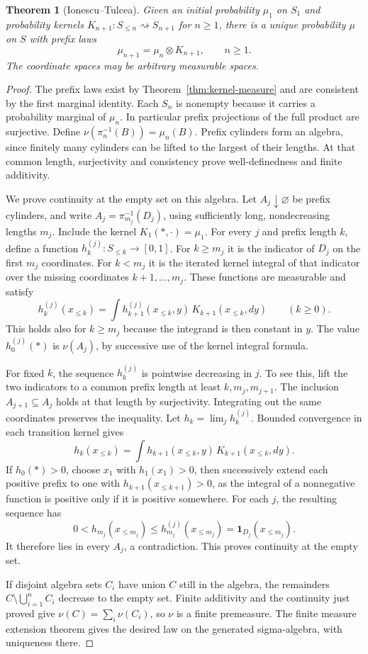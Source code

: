 \documentclass[11pt,oneside,openany]{book}
\newcommand{\ind}{\mathbf{1}}
\theoremstyle{plain}
\newtheorem{theorem}{Theorem}[chapter]
\theoremstyle{definition}
\theoremstyle{remark}
\begin{document}
\begin{theorem}[Ionescu--Tulcea]\label{thm:ionescu-tulcea}
Given an initial probability \(\mu_1\) on \(S_1\) and probability kernels \(K_{n+1}:S_{\le n}\rightsquigarrow S_{n+1}\) for \(n\ge1\), there is a unique probability \(\mu\) on \(S\) with prefix laws
\[
 \mu_{n+1}=\mu_n\otimes K_{n+1},\qquad n\ge1.
\]
The coordinate spaces may be arbitrary measurable spaces.
\end{theorem}
\begin{proof}
The prefix laws exist by Theorem~\ref{thm:kernel-measure} and are consistent by the first marginal identity. Each \(S_n\) is nonempty because it carries a probability marginal of \(\mu_n\). In particular prefix projections of the full product are surjective. Define \(\nu(\pi_n^{-1}(B))=\mu_n(B)\). Prefix cylinders form an algebra, since finitely many cylinders can be lifted to the largest of their lengths. At that common length, surjectivity and consistency prove well-definedness and finite additivity.

We prove continuity at the empty set on this algebra. Let \(A_j\downarrow\varnothing\) be prefix cylinders, and write \(A_j=\pi_{m_j}^{-1}(D_j)\), using sufficiently long, nondecreasing lengths \(m_j\). Include the kernel \(K_1(*,\cdot)=\mu_1\). For every \(j\) and prefix length \(k\), define a function \(h_k^{(j)}:S_{\le k}\to[0,1]\). For \(k\ge m_j\) it is the indicator of \(D_j\) on the first \(m_j\) coordinates. For \(k<m_j\) it is the iterated kernel integral of that indicator over the missing coordinates \(k+1,\ldots,m_j\). These functions are measurable and satisfy
\[
 h_k^{(j)}(x_{\le k})
   =\int h_{k+1}^{(j)}(x_{\le k},y)\,K_{k+1}(x_{\le k},dy)
 \qquad(k\ge0).
\]
This holds also for \(k\ge m_j\) because the integrand is then constant in \(y\). The value \(h_0^{(j)}(*)\) is \(\nu(A_j)\), by successive use of the kernel integral formula.

For fixed \(k\), the sequence \(h_k^{(j)}\) is pointwise decreasing in \(j\). To see this, lift the two indicators to a common prefix length at least \(k,m_j,m_{j+1}\). The inclusion \(A_{j+1}\subseteq A_j\) holds at that length by surjectivity. Integrating out the same coordinates preserves the inequality. Let \(h_k=\lim_j h_k^{(j)}\). Bounded convergence in each transition kernel gives
\[
 h_k(x_{\le k})
   =\int h_{k+1}(x_{\le k},y)\,K_{k+1}(x_{\le k},dy).
\]
If \(h_0(*)>0\), choose \(x_1\) with \(h_1(x_1)>0\), then successively extend each positive prefix to one with \(h_{k+1}(x_{\le k+1})>0\), as the integral of a nonnegative function is positive only if it is positive somewhere. For each \(j\), the resulting sequence has
\[
 0<h_{m_j}(x_{\le m_j})\le h_{m_j}^{(j)}(x_{\le m_j})
   =\ind_{D_j}(x_{\le m_j}).
\]
It therefore lies in every \(A_j\), a contradiction. This proves continuity at the empty set.

If disjoint algebra sets \(C_i\) have union \(C\) still in the algebra, the remainders \(C\setminus\bigcup_{i=1}^n C_i\) decrease to the empty set. Finite additivity and the continuity just proved give \(\nu(C)=\sum_i\nu(C_i)\), so \(\nu\) is a finite premeasure. The finite measure extension theorem gives the desired law on the generated sigma-algebra, with uniqueness there.
\end{proof}
\end{document}
